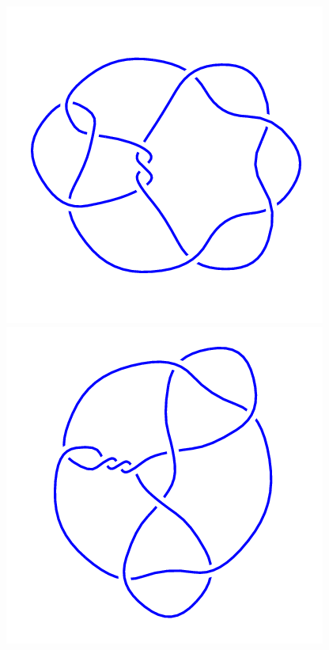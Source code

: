 \begin{figure}[H]
    \begin{minipage}[b]{.18\linewidth}
        \centering
        \includegraphics[width=\linewidth]{../data/10_62.png}
    \end{minipage}
    \begin{minipage}[b]{.18\linewidth}
        \centering
        \includegraphics[width=\linewidth]{../data/10_63.png}

\end{minipage}
\end{figure}
